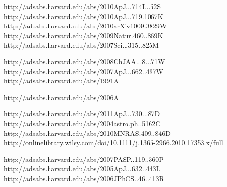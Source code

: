 
http://adsabs.harvard.edu/abs/2010ApJ...714L..52S
http://adsabs.harvard.edu/abs/2010ApJ...719.1067K
http://adsabs.harvard.edu/abs/2010arXiv1009.3829W
http://adsabs.harvard.edu/abs/2009Natur.460..869K
http://adsabs.harvard.edu/abs/2007Sci...315..825M

http://adsabs.harvard.edu/abs/2008ChJAA...8...71W
http://adsabs.harvard.edu/abs/2007ApJ...662..487W
http://adsabs.harvard.edu/abs/1991A%

http://adsabs.harvard.edu/abs/2006A%

http://adsabs.harvard.edu/abs/2011ApJ...730...87D
http://adsabs.harvard.edu/abs/2004astro.ph..5162C
http://adsabs.harvard.edu/abs/2010MNRAS.409..846D
http://onlinelibrary.wiley.com/doi/10.1111/j.1365-2966.2010.17353.x/full

http://adsabs.harvard.edu/abs/2007PASP..119..360P
http://adsabs.harvard.edu/abs/2005ApJ...632..443L
http://adsabs.harvard.edu/abs/2006JPhCS..46..413R

